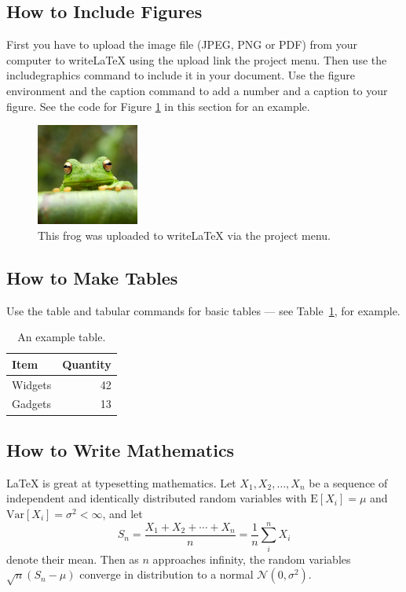 \documentclass[]{article}
\begin{document}
\subsection{How to Include Figures}
First you have to upload the image file (JPEG, PNG or PDF) from your computer to 
writeLaTeX using the upload link the project menu. Then use the includegraphics command
to include it in your document. Use the figure environment and the caption command to
add a number and a caption to your figure. See the code for Figure \ref{fig:frog} in this
section for an example.
\begin{figure}
\centering
\includegraphics[width=0.3\textwidth]{./images/frog.jpg}
\caption{\label{fig:frog}This frog was uploaded to writeLaTeX via the project menu.}
\end{figure}
\subsection{How to Make Tables}
Use the table and tabular commands for basic tables --- see Table~\ref{tab:widgets},
for example.
\begin{table}
\centering
\begin{tabular}{l|r}
Item & Quantity \\\hline
Widgets & 42 \\
Gadgets & 13
\end{tabular}
\caption{\label{tab:widgets}An example table.}
\end{table}
\subsection{How to Write Mathematics}
\LaTeX{} is great at typesetting mathematics. Let $X_1, X_2, \ldots, X_n$ be a sequence of independent and identically distributed random variables with $\text{E}[X_i] = \mu$ and $\text{Var}[X_i] = \sigma^2 < \infty$, and let
$$S_n = \frac{X_1 + X_2 + \cdots + X_n}{n}
      = \frac{1}{n}\sum_{i}^{n} X_i$$
denote their mean. Then as $n$ approaches infinity, the random variables $\sqrt{n}(S_n - \mu)$ converge in distribution to a normal $\mathcal{N}(0, \sigma^2)$.
\end{document}
